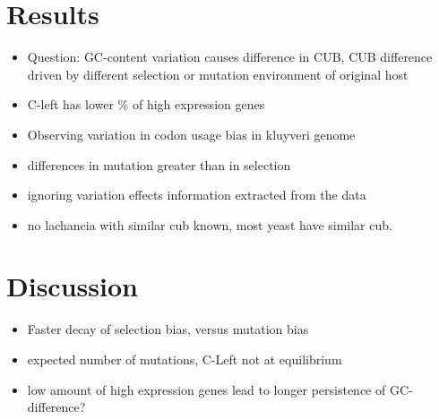 \documentclass[12pt,draft]{article}
\begin{document}
	
\section*{Results}

\begin{itemize}
	\item Question: GC-content variation causes difference in CUB, CUB difference driven by different selection or mutation environment of original host
	\item C-left has lower \% of high expression genes
	\item Observing variation in codon usage bias in kluyveri genome
	\item differences in mutation greater than in selection
	\item ignoring variation effects information extracted from the data
	\item no lachancia with similar cub known, most yeast have similar cub.
\end{itemize}

\section*{Discussion}

\begin{itemize}
	\item Faster decay of selection bias, versus mutation bias
	\item expected number of mutations, C-Left not at equilibrium
	\item low amount of high expression genes lead to longer persistence of GC-difference?
\end{itemize}
\end{document}
